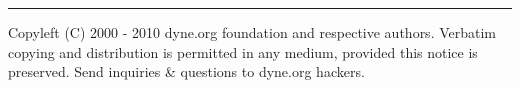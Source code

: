 
\vspace{.5cm}\hrule\vspace{.5cm}

Copyleft (C)  2000 - 2010 dyne.org foundation  and respective authors.
Verbatim copying and distribution is permitted in any medium, provided
this  notice is preserved.   Send inquiries  \& questions  to dyne.org
hackers.


